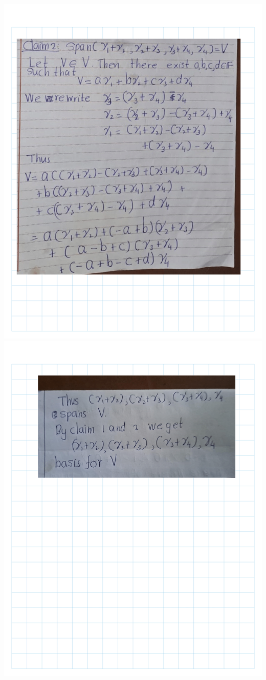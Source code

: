 \documentclass[
]{book}
\theoremstyle{definition}
\theoremstyle{definition}
\theoremstyle{definition}
\theoremstyle{definition}
\theoremstyle{remark}
\begin{document}
\includegraphics{fig/Ex 2B and 2C/EX2B (17).png}
\includegraphics{fig/Ex 2B and 2C/EX2B (18).png}
\end{document}
